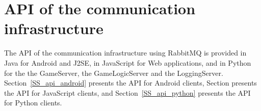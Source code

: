 

\section{API of the communication infrastructure}
\label{S_api}

The API of the communication infrastructure using \textsf{RabbitMQ} is
provided in Java for Android and J2SE, in JavaScript for Web applications, 
and in Python for the the GameServer, the GameLogicServer and the LoggingServer.
 Section~\ref{SS_api_android} presents the API for Android
clients, Section presents the API for JavaScript clients, and 
Section~\ref{SS_api_python} presents the API for Python
clients.





\endinput
